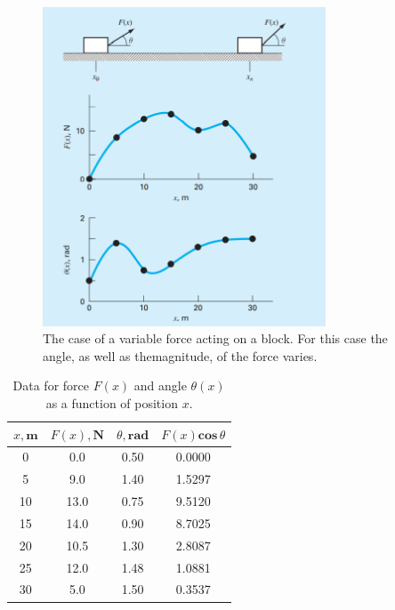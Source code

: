 \documentclass[../main.tex]{subfiles}
\begin{document}
\begin{figure}[hbt!]
	\centering
	\includegraphics[width=0.75\textwidth]{pic.001}
	\caption{\textsf{The case of a variable force acting on a block. For
	   this case the angle, as well as themagnitude, of the force varies.}} 
	\label{pic.001}
\end{figure}

\vspace{0,2in}

\begin{table}[htb!]
\centering
\caption{Data for force $F(x)$ and angle $\theta(x)$ as a function of
position $x$.}
\def\arraystretch{1.2}
\setlength{\tabcolsep}{36pt}
\begin{tabular}{cccc}
	\hline
	$x, \textbf{m}$ & $F(x),\textbf{N}$ &  $\theta, \textbf{rad}$ & $F(x) \textbf{cos}\, \theta$\\ \hline
	0 & 0.0 & 0.50 & 0.0000\\
	5 & 9.0 & 1.40 & 1.5297\\
	10 & 13.0 & 0.75 & 9.5120\\
	15 & 14.0 & 0.90 & 8.7025\\
	20 & 10.5 & 1.30 & 2.8087\\
	25 & 12.0 & 1.48 & 1.0881\\
	30 & 5.0 & 1.50 & 0.3537\\ \hline
\end{tabular}
\end{table}

\pagebreak
\end{document}
